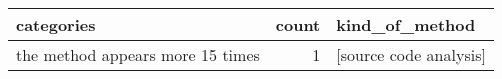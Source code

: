 \begin{tabular}{lrl}
\toprule
                        categories &  count &                                                                                                                                                                                                                                                                                                                                                                                                                                                                                                                                                                                                                                                                                                                                                                                                                                                                                                                                                                                                                                                                                                                                                                                                                                                                                                                                                                                                                                                                                                                      kind\_of\_method \\
\midrule
  the method appears more 15 times &      1 &                                                                                                                                                                                                                                                                                                                                                                                                                                                                                                                                                                                                                                                                                                                                                                                                                                                                                                                                                                                                                                                                                                                                                                                                                                                                                                                                                                                                                                                                                                              [source code analysis] \\

\end{tabular}
